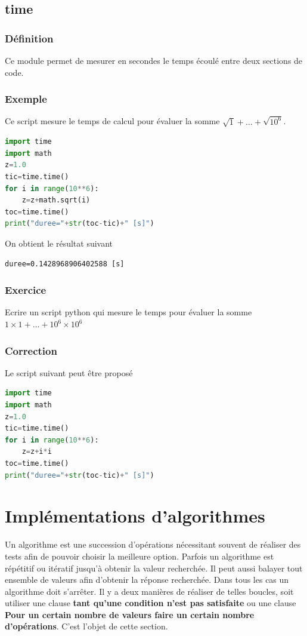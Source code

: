 \documentclass[a4paper,12pt]{article}
\begin{document}
\clearpage
\subsection{time}
\subsubsection{D\'efinition}
Ce module permet de mesurer en secondes le temps écoulé entre deux sections de code. 
\subsubsection{Exemple}
Ce script mesure le temps de calcul pour \'evaluer la somme $\sqrt{1}+\dots+\sqrt{10^6}$.
\begin{lstlisting}[language={Python}]
import time
import math
z=1.0
tic=time.time()
for i in range(10**6):
    z=z+math.sqrt(i)
toc=time.time()
print("duree="+str(toc-tic)+" [s]")
\end{lstlisting}
On obtient le r\'esultat suivant
\begin{verbatim}
duree=0.1428968906402588 [s]
\end{verbatim}
\subsubsection{Exercice}
Ecrire un script python qui mesure le temps pour \'evaluer la somme $1\times 1+\dots+10^6\times 10^6$
\subsubsection{Correction}
Le script suivant peut \^etre propos\'e
\begin{lstlisting}[language={Python}]
import time
import math
z=1.0
tic=time.time()
for i in range(10**6):
    z=z+i*i
toc=time.time()
print("duree="+str(toc-tic)+" [s]")
\end{lstlisting}

\clearpage
\section{Impl\'ementations d'algorithmes}
Un  algorithme est une succession d'opérations nécessitant souvent de réaliser des tests afin de pouvoir choisir la meilleure option. Parfois un algorithme est répétitif ou itératif jusqu'à obtenir la valeur recherchée. Il peut aussi balayer tout ensemble de valeurs afin d'obtenir la réponse recherchée. 
Dans tous les cas un algorithme doit s'arrêter. Il y a deux manières de réaliser de telles boucles, soit utiliser une clause \textbf{tant qu'une condition n'est pas satisfaite} ou une clause \textbf{Pour un certain nombre de valeurs faire un certain nombre d'opérations}. C'est l'objet de cette section.
\end{document}
